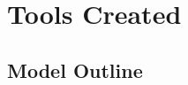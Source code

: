 \chapter{Tools Created}
\label{implementation_head}

\section{Model Outline}
\label{model_outline}

